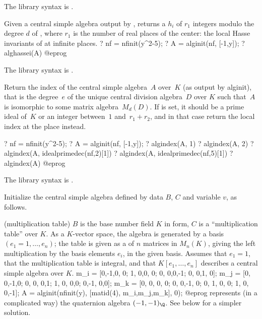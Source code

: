 The library syntax is .

\label{se:alghassei}
Given a central simple algebra  output by , returns
a  $h_i$ of $r_1$ integers modulo the degree $d$ of ,
where $r_1$ is the number of real places of the center: the local Hasse
invariants of  at infinite places.
\bprog
? nf = nfinit(y^2-5);
? A = alginit(nf, [-1,y]);
? alghassei(A)
@eprog

The library syntax is .

\label{se:algindex}
Return the index of the central simple algebra~$A$ over~$K$ (as output by
alginit), that is the degree~$e$ of the unique central division algebra~$D$
over $K$ such that~$A$ is isomorphic to some matrix algebra~$M_d(D)$. If
 is set, it should be a prime ideal of~$K$ or an integer between~$1$
and~$r_1+r_2$, and in that case return the local index at the place 
instead.

\bprog
? nf = nfinit(y^2-5);
? A = alginit(nf, [-1,y]);
? algindex(A, 1)
? algindex(A, 2)
? algindex(A, idealprimedec(nf,2)[1])
? algindex(A, idealprimedec(nf,5)[1])
? algindex(A)
@eprog

The library syntax is .

\label{se:alginit}
Initialize the central simple algebra defined by data $B$, $C$ and
variable $v$, as follows.

\item (multiplication table) $B$ is the base number field $K$ in 
form, $C$ is a ``multiplication table'' over $K$.
As a $K$-vector space, the algebra is generated by a basis
$(e_1 = 1,\dots, e_n)$; the table is given as a  of $n$ matrices in
$M_n(K)$, giving the left multiplication by the basis elements $e_i$, in the
given basis.
Assumes that $e_1= 1$, that the multiplication table is integral, and that
$K[e_1,\dots,e_n]$ describes a central simple algebra over $K$.
\bprog
{ m_i = [0,-1,0, 0;
         1, 0,0, 0;
         0, 0,0,-1;
         0, 0,1, 0];
  m_j = [0, 0,-1,0;
         0, 0, 0,1;
         1, 0, 0,0;
         0,-1, 0,0];
  m_k = [0, 0, 0, 0;
         0, 0,-1, 0;
         0, 1, 0, 0;
         1, 0, 0,-1];
  A = alginit(nfinit(y), [matid(4), m_i,m_j,m_k],  0); }
@eprog represents (in a complicated way) the quaternion algebra $(-1,-1)_\Q$.
See below for a simpler solution.

